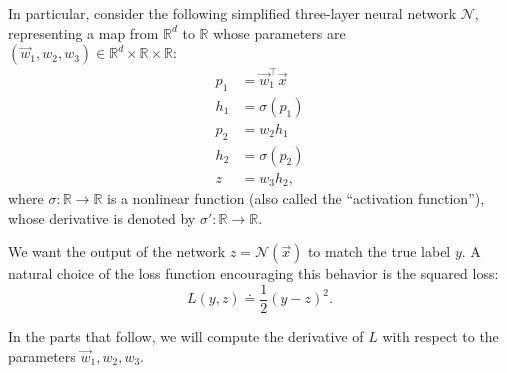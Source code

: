 \documentclass[10pt]{article}
\theoremstyle{definition}
\theoremstyle{plain}
\newcommand{\RR}{\mathbb{R}}
\begin{document}
In particular, consider the following simplified three-layer neural network $\mathcal{N}$, representing a map from $\RR^d$ to $\RR$ whose parameters are $(\vec{w}_1, w_2, w_3) \in \RR^d \times \RR \times \RR$:
\begin{align}
p_1 &= \vec{w}_1^\top \vec{x} \\
h_1 &= \sigma(p_1) \\
p_2 &= w_2 h_1 \\
h_2 &= \sigma(p_2) \\
z &= w_3 h_2,
\end{align}
where $\sigma : \RR \to \RR$ is a nonlinear function (also called the ``activation function''), whose derivative is denoted by $\sigma' : \RR \to \RR$.

We want the output of the network $z = \mathcal{N}(\vec{x})$ to match the true label $y$. A natural choice of the loss function encouraging this behavior is the squared loss:
\begin{equation}
L(y, z) \doteq \frac{1}{2}(y - z)^2.
\end{equation}

In the parts that follow, we will compute the derivative of $L$ with respect to the parameters $\vec{w}_1, w_2, w_3$.
\end{document}
